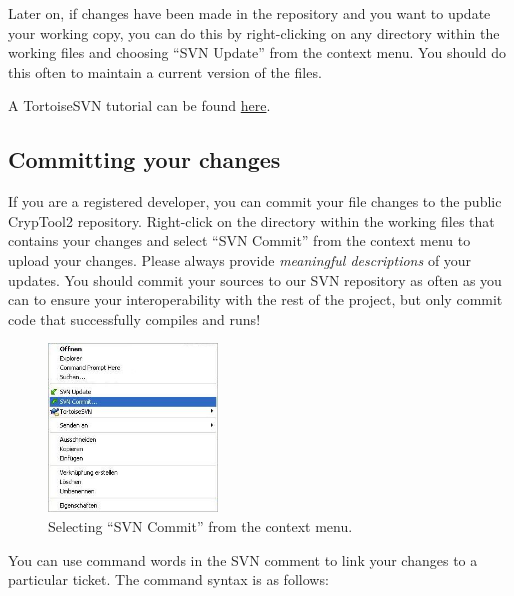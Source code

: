 Later on, if changes have been made in the repository and you want to update your working copy, you can do this by right-clicking on any directory within the working files and choosing ``SVN Update'' from the context menu. You should do this often to maintain a current version of the files.

A TortoiseSVN tutorial can be found \href{http://www.mind.ilstu.edu/research/robots/iris4/developers/svntutorial}{here}.

\subsection{Committing your changes}
\label{CommitingYourChanges}

If you are a registered developer, you can commit your file changes to the public CrypTool2 repository. Right-click on the directory within the working files that contains your changes and select ``SVN Commit'' from the context menu to upload your changes. Please always provide \textit{meaningful descriptions} of your updates. You should commit your sources to our SVN repository as often as you can to ensure your interoperability with the rest of the project, but only commit code that successfully compiles and runs!

\begin{figure}[h!]
	\centering
		\includegraphics[width=0.40\textwidth]{figures/tortoise_svn_commit.jpg}
	\caption{Selecting ``SVN Commit'' from the context menu.}
	\label{fig:tortoise_svn_commit}
\end{figure}

You can use command words in the SVN comment to link your changes to a particular ticket. The command syntax is as follows:

\begin{center}
\end{center}

